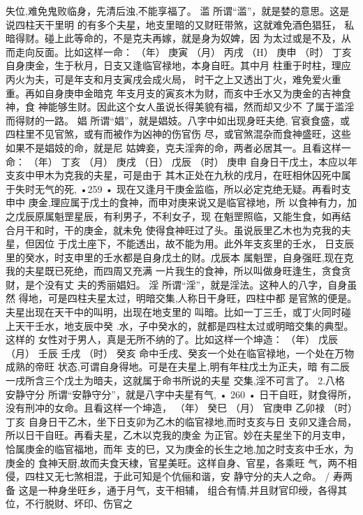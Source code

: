 失位,难免鬼败临身，先清后浊,不能享福了。
滥 所谓“滥”，就是婪的意思。这是说四柱天干里明
的有多个夫星，地支里暗的又财旺带煞，这就难免酒色猖狂，
私暗得财。碰上此等命的，不是克夫再嫁，就是身为奴婢，因
为太过或是不及，从而走向反面。比如这样一命：
（年） 庚寅
（月） 丙戌
（H） 庚申
（时） 丁亥
自身庚金，生于秋月，日支又逢临官禄地，本身自旺。其中月
柱重于时柱，理应丙火为夫，可是年支和月支寅戌会成火局，
时干之上又透出丁火，难免爱火重重。再如自身庚申金暗克
年支月支的寅亥木为财，而亥中壬水又为庚金的吉神食神，食
神能够生财。因此这个女人虽说长得美貌有福，然而却又少不
了属于滥淫而得财的一路。
娼 所谓“娼”，就是娼妓。八字中如出现身旺夫绝,
官衰食盛，或四柱里不见官煞，或有而被作为凶神的伤官伤
尽，或官煞混杂而食神盛旺，这些如果不是娼妓的命，就是尼
姑婢妾，克夫淫奔的命，两者必居其一。且看这样一命：
（年） 丁亥
（月） 庚戌
（日） 戊辰
（时） 庚申
自身日干戊土，本应以年支亥中甲木为克我的夫星，可是由于
其木正处在九秋的戌月，在旺相休囚死中属于失时无气的死,
•259 •
现在又逢月干庚金监临，所以必定克绝无疑。再看时支申中
庚金,理应属于戊土的食神，而申对庚来说又是临官禄地，所
以食神有力，加之戊辰原属魁罡星辰，有利男子，不利女子，现
在魁罡照临，又能生食，如再结合月干和时，干的庚金，就未免
使得食神旺过了头。虽说辰里乙木也为克我的夫星，但因位
于戊土座下，不能透出，故不能为用。此外年支亥里的壬水，
日支辰里的癸水，时支申里的壬水都是自身戊土的财。戊辰本
属魁罡，自身强旺,现在克我的夫星既已死绝，而四周又充满
一片我生的食神，所以叫做身旺逢生，贪食贪财，是个没有丈
夫的秀丽娼妇。
淫 所谓“淫”，就是淫法。这种人的八字，自身虽然
得地，可是四柱夫星太过，明暗交集,人称日干身旺，四柱中都
是官煞的便是。夫星出现在天干中的叫明，出现在地支里的
叫暗。比如一丁三壬，或丁火同时碰上天干壬水，地支辰中癸
.水，子中癸水的，就都是四柱太过或明暗交集的典型。这样的
女性对于男人，真是无所不纳的了。比如这样一个坤造：
（年） 戊辰
（月） 壬辰
壬戌
（时） 癸亥
命中壬戌、癸亥一个处在临官禄地，一个处在万物成熟的帝旺
状态,可谓自身得地。可是在夫星上,明有年柱戊土为正夫，暗
有二辰一戌所含三个戊土为暗夫，这就属于命书所说的夫星
交集,淫不可言了。
2.八格
安静守分 所谓“安静守分”，就是八字中夫星有气,
• 260 •
日干自旺，财食得所，没有刑冲的女命。且看这样一个坤造，
（年） 癸巳
（月） 官庚申
乙卯禄
（时） 丁亥
自身日干乙木，坐下日支卯为乙木的临官禄地,而时支亥与日
支卯又逢合局，所以日干自旺。再看夫星，乙木以克我的庚金
为正官。妙在夫星坐下的月支申，恰属庚金的临官福地，而年
支的巳，又为庚金的长生之地,加之时支亥中壬水，为庚金的
食神天厨,故而夫食天棣，官星美旺。这样自身、官星，各乘旺
气，两不相侵，四柱又无七煞相混，于此可知是个伉俪和谐，安
静守分的夫人之命。 /
寿两备 这是一种身坐旺乡，通于月气，支干相辅，
组合有情,并且财官印绶，各得其位，不行脱财、坏印、伤官之
